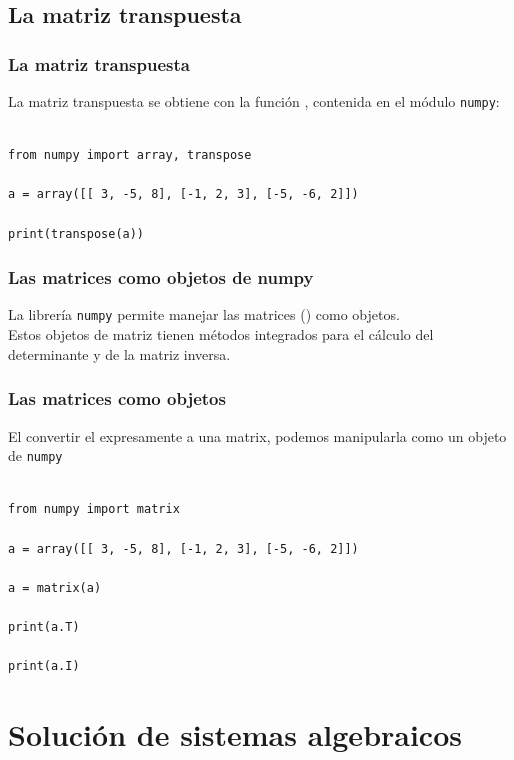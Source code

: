 \subsection{La matriz transpuesta}
\begin{frame}
\frametitle{La matriz transpuesta}
La matriz transpuesta se obtiene con la función , contenida en el módulo \texttt{numpy}: 
\begin{lstlisting}[caption=Cálculo de la matriz transpuesta, style=FormattedNumber, basicstyle=\linespread{1.1}\ttfamily=\small, columns=fullflexible]

from numpy import array, transpose

a = array([[ 3, -5, 8], [-1, 2, 3], [-5, -6, 2]])

print(transpose(a))
\end{lstlisting}
\end{frame}
\begin{frame}
\frametitle{Las matrices como objetos de numpy}
La librería \texttt{numpy} permite manejar las matrices () como objetos.
\\
\bigskip
Estos objetos de matriz tienen métodos integrados para el cálculo del determinante y de la matriz inversa.
\end{frame}
\begin{frame}
\frametitle{Las matrices como objetos}
El convertir el  expresamente a una matrix, podemos manipularla como un objeto de \texttt{numpy}
\begin{lstlisting}[caption=Cálculo de la matriz transpuesta, style=FormattedNumber, basicstyle=\linespread{1.1}\ttfamily=\small, columns=fullflexible]

from numpy import matrix

a = array([[ 3, -5, 8], [-1, 2, 3], [-5, -6, 2]])

a = matrix(a)

print(a.T)

print(a.I)
\end{lstlisting}
\end{frame}
\section{Solución de sistemas algebraicos}
